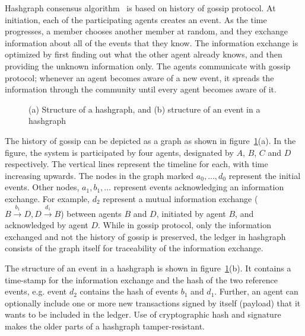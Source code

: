  
Hashgraph consensus algorithm~\citep{Baird:2016:1} is based on history of gossip protocol. At initiation, each of the participating 
agents creates an event. As the time progresses, a member chooses another member at random, and they exchange information about all of 
the events that they know. The information exchange is optimized by first finding out what the other agent already knows, 
and then providing the unknown information only. The agents communicate with gossip protocol; whenever an agent becomes aware of 
a new event, it spreads the information through the community until every agent becomes aware of it. 

\begin{figure}[!htbp]
	\caption{(a) Structure of a hashgraph, and (b) structure of an event in a hashgraph}
	\label{fig:ledger:hashgraph}
\end{figure}

The history of gossip can be depicted as a graph as shown in figure~\ref{fig:ledger:hashgraph}(a). In the figure, the system
is participated by four agents, designated by $A$, $B$, $C$ and $D$ respectively. The vertical lines represent the timeline for each, 
with time increasing upwards. The nodes in the graph marked $a_0, \dots, d_0$ represent the initial events.  Other nodes, 
$a_1, b_1, \dots$ represent events acknowledging an information exchange. For example, $d_2$ represent a mutual information exchange 
($B \xrightarrow{b_1} D, D \xrightarrow{d_1} B$) between agents $B$ and $D$, initiated by agent $B$, and acknowledged by agent $D$.
%
While in gossip protocol, only the information exchanged and not the history of gossip is preserved, the ledger in hashgraph 
consists of the graph itself for traceability of the information exchange. 

The structure of an event in a hashgraph is shown in figure~\ref{fig:ledger:hashgraph}(b). It contains a time-stamp for the 
information exchange and the hash of the two reference events, e.g. event $d_2$ contains the hash of events $b_1$ and $d_1$. 
Further, an agent can optionally include one or more new transactions signed by itself (payload) that it wants to be included 
in the ledger. Use of cryptographic hash and signature makes the older parts of a hashgraph tamper-resistant. 

